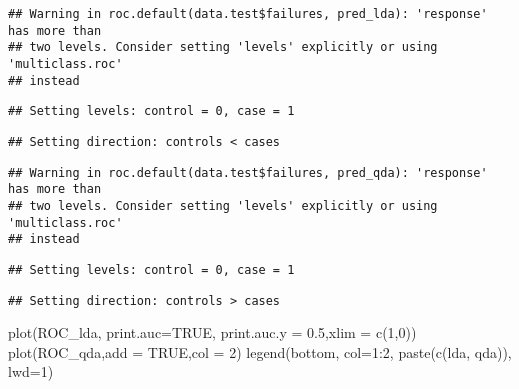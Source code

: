 \documentclass[
]{article}
\newenvironment{Shaded}{\begin{snugshade}}{\end{snugshade}}
\newcommand{\AttributeTok}[1]{\textcolor[rgb]{0.77,0.63,0.00}{#1}}
\newcommand{\ConstantTok}[1]{\textcolor[rgb]{0.00,0.00,0.00}{#1}}
\newcommand{\DecValTok}[1]{\textcolor[rgb]{0.00,0.00,0.81}{#1}}
\newcommand{\FloatTok}[1]{\textcolor[rgb]{0.00,0.00,0.81}{#1}}
\newcommand{\FunctionTok}[1]{\textcolor[rgb]{0.00,0.00,0.00}{#1}}
\newcommand{\NormalTok}[1]{#1}
\newcommand{\OtherTok}[1]{\textcolor[rgb]{0.56,0.35,0.01}{#1}}
\newcommand{\SpecialCharTok}[1]{\textcolor[rgb]{0.00,0.00,0.00}{#1}}
\newcommand{\StringTok}[1]{\textcolor[rgb]{0.31,0.60,0.02}{#1}}
\begin{document}
\begin{verbatim}
## Warning in roc.default(data.test$failures, pred_lda): 'response' has more than
## two levels. Consider setting 'levels' explicitly or using 'multiclass.roc'
## instead
\end{verbatim}

\begin{verbatim}
## Setting levels: control = 0, case = 1
\end{verbatim}

\begin{verbatim}
## Setting direction: controls < cases
\end{verbatim}

\begin{Shaded}
\end{Shaded}

\begin{verbatim}
## Warning in roc.default(data.test$failures, pred_qda): 'response' has more than
## two levels. Consider setting 'levels' explicitly or using 'multiclass.roc'
## instead
\end{verbatim}

\begin{verbatim}
## Setting levels: control = 0, case = 1
\end{verbatim}

\begin{verbatim}
## Setting direction: controls > cases
\end{verbatim}

\begin{Shaded}
\begin{Highlighting}[]
\FunctionTok{plot}\NormalTok{(ROC\_lda, }\AttributeTok{print.auc=}\ConstantTok{TRUE}\NormalTok{,  }\AttributeTok{print.auc.y =} \FloatTok{0.5}\NormalTok{,}\AttributeTok{xlim =} \FunctionTok{c}\NormalTok{(}\DecValTok{1}\NormalTok{,}\DecValTok{0}\NormalTok{))}
\FunctionTok{plot}\NormalTok{(ROC\_qda,}\AttributeTok{add =} \ConstantTok{TRUE}\NormalTok{,}\AttributeTok{col =} \DecValTok{2}\NormalTok{)}
\FunctionTok{legend}\NormalTok{(}\StringTok{\textquotesingle{}bottom\textquotesingle{}}\NormalTok{, }\AttributeTok{col=}\DecValTok{1}\SpecialCharTok{:}\DecValTok{2}\NormalTok{, }\FunctionTok{paste}\NormalTok{(}\FunctionTok{c}\NormalTok{(}\StringTok{\textquotesingle{}lda\textquotesingle{}}\NormalTok{, }\StringTok{\textquotesingle{}qda\textquotesingle{}}\NormalTok{)),  }\AttributeTok{lwd=}\DecValTok{1}\NormalTok{)}
\end{Highlighting}
\end{Shaded}
\end{document}
